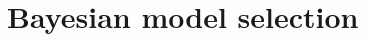 \begin{comment}
\begin{verbatim}
             without mask
                              female?            male?
    model                   D    p0  sigma    D   p0   sigma
D(sex),g0(sex),\sigma      2.45 0.08 6435.51 3.16 0.04 6435.51
D,g0,\sigma                2.83 0.06 6298.66 2.83 0.06 6298.66
D(sex),g0,\sigma           2.69 0.06 6298.69 2.96 0.06 6298.69
D(sex),g0(sex),\sigma(sex) 2.59 0.08 6080.70 2.99 0.04 6833.16
D(sex),g0, \sigma(sex)     2.70 0.06 6280.49 2.95 0.06 6319.03


             with mask
                              female?            male?
    model                   D    p0  sigma    D   p0   sigma
D(sex),g0(sex),\sigma      3.64 0.07 6382.88 4.73 0.03 6382.88
D(sex),g0(sex)\sigma(sex)  3.87 0.07 5859.40 4.41 0.03 7039.09
D, g0, \sigma              4.18 0.05 6282.62 4.18 0.05 6282.62
D(sex),g0,\sigma           3.98 0.05 6282.65 4.38 0.05 6282.65
D(sex),g0,\sigma(sex)      3.93 0.05 6357.26 4.41 0.05 6220.22
\end{verbatim}
\end{comment}




\section{Bayesian model selection}

